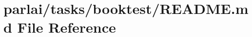 \hypertarget{parlai_2tasks_2booktest_2README_8md}{}\section{parlai/tasks/booktest/\+R\+E\+A\+D\+ME.md File Reference}
\label{parlai_2tasks_2booktest_2README_8md}
